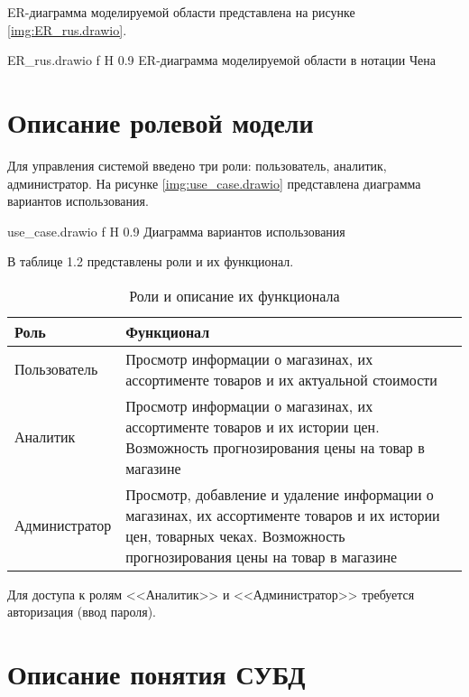 \documentclass[a4paper]{bmstu}
\begin{document}
ER-диаграмма моделируемой области представлена на рисунке \ref{img:ER_rus.drawio}.

	{ER_rus.drawio}
	{f}
	{H}
	{0.9\textwidth}
	{ER-диаграмма моделируемой области в нотации Чена}

\section{Описание ролевой модели}

Для управления системой введено три роли: пользователь, аналитик, администратор. На рисунке \ref{img:use_case.drawio} представлена диаграмма вариантов использования.

	{use_case.drawio}
	{f}
	{H}
	{0.9\textwidth}
	{Диаграмма вариантов использования}

В таблице 1.2 представлены роли и их функционал.

\begin{table}[H]
	\caption{Роли и описание их функционала}
	\begin{center}
		\begin{tabular}{| l | p{12 cm} |} 
			\hline
			
			\textbf{Роль} & \textbf{Функционал} \\  
			
			\hline
			
			Пользователь & Просмотр информации о магазинах, их ассортименте товаров и их актуальной стоимости \\
			
			\hline
			
			Аналитик & Просмотр информации о магазинах, их ассортименте товаров и их истории цен. Возможность прогнозирования цены на товар в магазине \\
			
			\hline
			
			Администратор & Просмотр, добавление и удаление информации о магазинах, их ассортименте товаров и их истории цен, товарных чеках. Возможность прогнозирования цены на товар в магазине \\
			
			\hline
		\end{tabular}
	\end{center}
\end{table}



Для доступа к ролям <<Аналитик>> и <<Администратор>> требуется авторизация (ввод пароля).

\section{Описание понятия СУБД}
\end{document}
